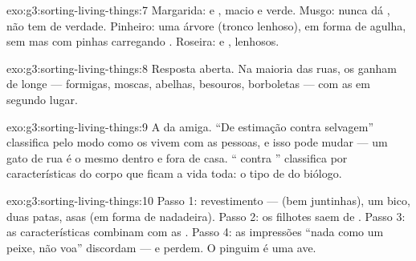 \begin{solution}{exo:g3:sorting-living-things:7}
Margarida:  e ,  macio e verde. Musgo: nunca dá
, não tem  de verdade. Pinheiro: uma árvore (tronco
lenhoso),  em forma de agulha, sem  mas com pinhas
carregando . Roseira:  e ,  lenhosos.
\end{solution}

\begin{solution}{exo:g3:sorting-living-things:8}
Resposta aberta. Na maioria das ruas, os  ganham de longe ---
formigas, moscas, abelhas, besouros, borboletas --- com as  em
segundo lugar.
\end{solution}

\begin{solution}{exo:g3:sorting-living-things:9}
A da amiga. ``De estimação contra selvagem'' classifica pelo modo
como os  vivem com as pessoas, e isso pode mudar --- um gato
de rua é o mesmo  dentro e fora de casa. `` contra
'' classifica por características do corpo que ficam a vida
toda: o tipo de  do biólogo.
\end{solution}

\begin{solution}{exo:g3:sorting-living-things:10}
Passo 1: revestimento ---  (bem juntinhas), um bico, duas
patas, asas (em forma de nadadeira). Passo 2: os filhotes saem de
. Passo 3: as características combinam com as . Passo 4: as
impressões ``nada como um peixe, não voa'' discordam --- e perdem. O
pinguim é uma ave.
\end{solution}

